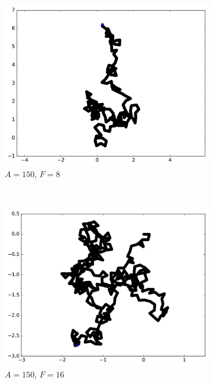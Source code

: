 \begin{figure}[htb]
\begin{subfigure}[t]{\subImgWmo}
			\includegraphics[width=\textwidth]{figures/ch3/synTraj_219_150_8}
			\caption[$A = 150$, $F=8$]{$A = 150$, $F=8$}
			\label{fig:synTraj_219_150_8}
		\end{subfigure}
		~
		\begin{subfigure}[t]{\subImgWmo}
			\centering
			\includegraphics[width=\textwidth]{figures/ch3/synTraj_219_150_16}
			\caption[$A = 150$, $F=16$]{$A = 150$, $F=16$}
			\label{fig:synTraj_219_150_16}
		\end{subfigure}
		~
		\begin{subfigure}[t]{\subImgWmo}
			\centering

\end{subfigure}
\end{figure}
